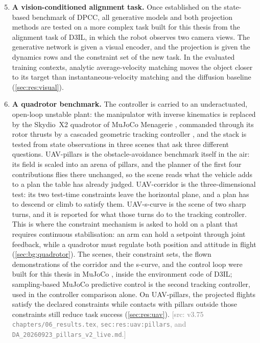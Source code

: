 \documentclass[headsepline,footsepline,footinclude=false,oneside,fontsize=11pt,paper=a4,listof=totoc,bibliography=totoc]{scrbook}
\theoremstyle{definition}
\theoremstyle{plain}
\theoremstyle{remark}
\newif\ifsubmission
\newcommand{\srcnote}[1]{\ifsubmission\else\textcolor{gray}{\footnotesize\textsf{[src: #1]}}\fi}
\begin{document}
\begin{enumerate}
  \setcounter{enumi}{4}
  \item \textbf{A vision-conditioned alignment task.} Once established on the state-based benchmark
    of \ac{DPCC}, all generative models and both projection methods are tested on a more complex
    task built for this thesis from the alignment task of D3IL, in which the robot observes two camera
    views. The generative network is given a visual encoder, and the projection is given the dynamics
    rows and the constraint set of the new task.
    In the evaluated training contexts, analytic average-velocity matching moves the object closer
    to its target than instantaneous-velocity matching and the diffusion baseline
    (\autoref{sec:res:visual}).
  \item \textbf{A quadrotor benchmark.} The controller is carried to an underactuated, open-loop
    unstable plant: the manipulator with inverse kinematics is replaced by the Skydio~X2 quadrotor of
    MuJoCo Menagerie \parencite{zakka2022menagerie}, commanded through its rotor thrusts by a cascaded
    geometric tracking controller \parencite{lee2010geometric}, and the stack is tested from state
    observations in three scenes that ask three different questions. UAV-pillars is the
    obstacle-avoidance benchmark itself in the air: its field is scaled into an arena of pillars, and
    the planner of the first four contributions flies there unchanged, so the scene reads what the
    vehicle adds to a plan the table has already judged. UAV-corridor is the three-dimensional test:
    its two test-time constraints leave the horizontal plane, and a plan has to descend or climb to
    satisfy them. UAV-s-curve is the scene of two sharp turns, and it is reported for what those turns
    do to the tracking controller. This is where the constraint mechanism is asked to hold on a plant
    that requires continuous stabilisation: an arm can hold a setpoint through joint feedback, while
    a quadrotor must regulate both position and attitude in flight
    (\autoref{sec:bg:quadrotor}). The scenes, their constraint sets, the flown demonstrations of the
    corridor and the s-curve, and the control loop were built for this thesis in MuJoCo
    \parencite{todorov2012mujoco}, inside the environment code of D3IL; sampling-based MuJoCo
    predictive control \parencite{howell2022predictive} is the second tracking controller, used in
    the controller comparison alone.
    On UAV-pillars, the projected flights satisfy the declared constraints while contacts with
    pillars outside those constraints still reduce task success (\autoref{sec:res:uav}).
    \srcnote{v3.75 \texttt{chapters/06\_results.tex},
    \texttt{sec:res:uav:pillars}, and \texttt{DA\_20260923\_pillars\_v2\_live.md}.}
\end{enumerate}
\end{document}
